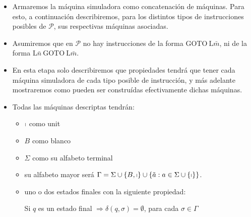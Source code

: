\begin{frame}
	\begin{itemize}
		\item Armaremos la máquina simuladora como concatenación de máquinas. Para esto, a continuación describiremos, para
		los distintos tipos de instrucciones posibles de $\mathcal{P}$, sus respectivas máquinas asociadas.

		\item Asumiremos que en $\mathcal{P}$ no hay instrucciones de la forma $\mathrm{GOTO} \ \mathrm{L}\bar{m}$, ni de la
		forma $\mathrm{L}\bar{n} \ \mathrm{GOTO} \ \mathrm{L}\bar{m}$.

		\item En esta etapa solo describiremos que propiedades tendrá que tener cada máquina simuladora de cada tipo posible
		de instrucción, y más adelante mostraremos como pueden ser construídas efectivamente dichas máquinas.

		\item Todas las máquinas descriptas tendrán:
		 	\begin{itemize}
				\item $\shortmid$ como unit
				\item $B$ como blanco
				\item $\Sigma$ como su alfabeto terminal
				\item su alfabeto mayor será $\Gamma = \Sigma \cup \{B,\shortmid\} \cup \{\tilde{a}: a \in \Sigma \cup
					\{\shortmid\}\}$.
				\item uno o dos estados finales con la siguiente propiedad:
					\vspace{3mm}
					\begin{center}
						Si $q$ es un estado final $\Rightarrow \delta(q,\sigma) = \emptyset$, para cada $\sigma \in \Gamma$
					\end{center}
			\end{itemize}
	\end{itemize}

\end{frame}
